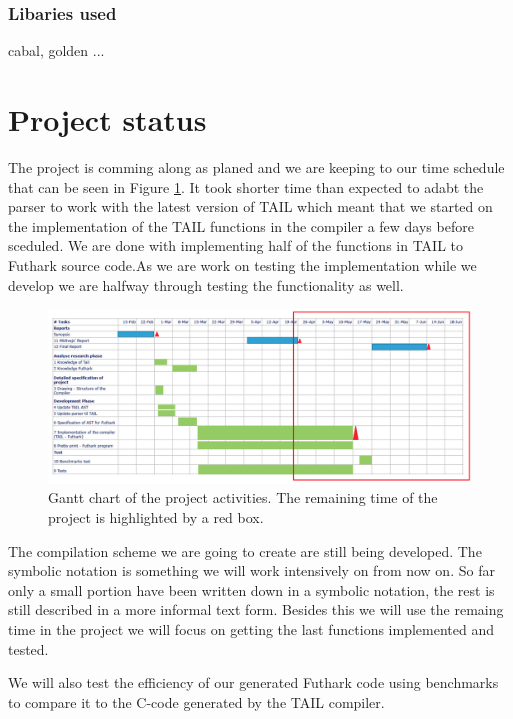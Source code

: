 \documentclass[11pt]{article}
\begin{document}
\subsubsection{Libaries used}
cabal, golden ...

\section{Project status}
The project is comming along as planed and we are keeping to our time schedule that can be seen in Figure \ref{fig:gantt}.
It took shorter time than expected to adabt the parser to work with the latest version of TAIL
which meant that we started on the implementation of the TAIL functions in the compiler a few days before sceduled. 
We are done with implementing half of the functions in TAIL to Futhark source code.As we are work on testing the
implementation while we develop we are halfway through testing the functionality as well. 

\begin{figure}[width=\textwidth]%
    \centering
    \includegraphics[width=\textwidth]{midvejsgantt3.png}
    \caption{Gantt chart of the project activities. The remaining time of the project is highlighted by a red box.}
    \label{fig:gantt}
\end{figure}

The compilation scheme we are going to create are still being developed. The symbolic notation is something we will work intensively on from now on. So far only a small portion have been written down in a symbolic notation, the rest is still described in a more informal text form. 
Besides this we will use the remaing time in the project we will focus on getting the last functions implemented and tested.

We will also test the efficiency of our generated Futhark code using benchmarks to compare it to the C-code generated by the TAIL compiler. 


\newpage
\end{document}
